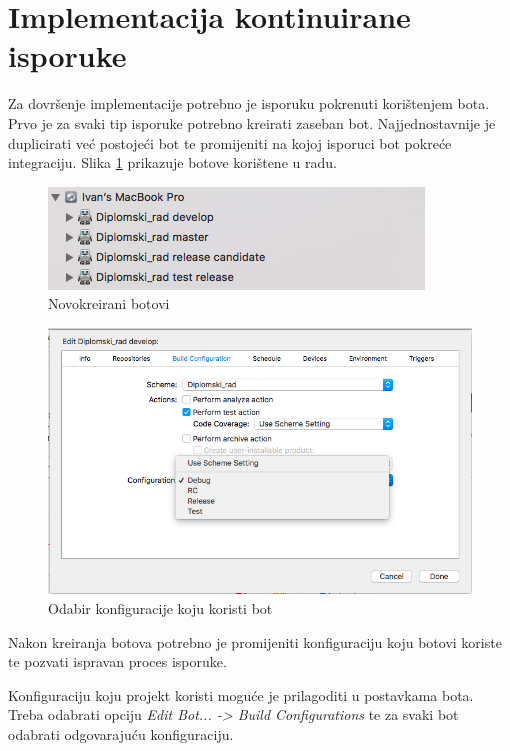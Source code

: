 \documentclass[times, utf8, diplomski, numeric]{fer}
\begin{document}
\section{Implementacija kontinuirane isporuke}

Za dovršenje implementacije potrebno je isporuku pokrenuti korištenjem bota. Prvo je za svaki tip isporuke potrebno kreirati zaseban bot. Najjednostavnije je duplicirati već postojeći bot te promijeniti na kojoj isporuci bot pokreće integraciju. Slika \ref{fig:MultipleBots} prikazuje botove korištene u radu.

\begin{figure}[h!]
\centering
\includegraphics[scale=0.7]{MultipleBots}
\caption{Novokreirani botovi}
\label{fig:MultipleBots}
\end{figure}

\begin{figure}[b!]
\centering
\includegraphics[scale=0.5]{BotConfiguration}
\caption{Odabir konfiguracije koju koristi bot}
\label{fig:BotConfiguration}
\end{figure}

Nakon kreiranja botova potrebno je promijeniti konfiguraciju koju botovi koriste te pozvati ispravan proces isporuke.

Konfiguraciju koju projekt koristi moguće je prilagoditi u postavkama bota. Treba odabrati opciju \textit{Edit Bot... -> Build Configurations} te za svaki bot odabrati odgovarajuću konfiguraciju.
\end{document}
